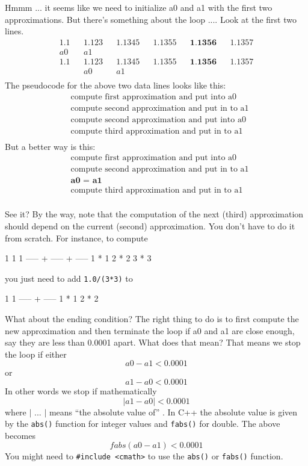 Hmmm ... it seems like we need to initialize a0 and a1 with the first
two approximations. But there's something about the loop
.... Look at the first two lines.
\begin{align*}
1.1         &&1.123       &&1.1345      &&1.1355      &&\textbf{1.1356} &&1.1357 \\
a0         &&a1 \\
1.1         &&1.123       &&1.1345      &&1.1355      &&\textbf{1.1356} &&1.1357 \\
&&a0        &&a1 \\
\end{align*}
The pseudocode for the above two data lines looks like this:
\begin{align*}
&\text{compute first approximation and put into a0}\\
&\text{compute second approximation and put in to a1}\\
&\text{compute second approximation and put into a0}\\
&\text{compute third approximation and put in to a1}\\
\end{align*}
But a better way is this:
\begin{align*}
&\text{compute first approximation and put into a0}\\
&\text{compute second approximation and put in to a1}\\
&\textbf{a0 = a1}\\
&\text{compute third approximation and put in to a1}\\
\end{align*}

See it? By the way, note that the computation of the next (third)
approximation should depend on the current (second) approximation. You
don't have to do it from scratch. For instance, to
compute
\begin{console}
  1       1       1
----- + ----- + -----
1 * 1   2 * 2   3 * 3
\end{console}
you just need to add \texttt{1.0/(3*3)} to
\begin{console}
  1       1
----- + -----
1 * 1   2 * 2
\end{console}
What about the ending condition? The right thing to do is to first
compute the new approximation and then terminate the loop if a0 and a1
are close enough, say they are less than 0.0001 apart. What does that
mean? That means we stop the loop if either
\[a0 - a1 < 0.0001\]
or
\[a1 - a0 < 0.0001\]
In other words we stop if mathematically
\[
| a1 - a0 | < 0.0001
\]
where $|$ ... $|$ means ``the absolute value of'' . In C++ the absolute value is given by the \texttt{abs()} function for integer values and \texttt{fabs()} for double. The above becomes
\[
fabs(a0 - a1) < 0.0001
\]
You might need to \texttt{\#include <cmath>} to use the \texttt{abs()} or \texttt{fabs()} function.

